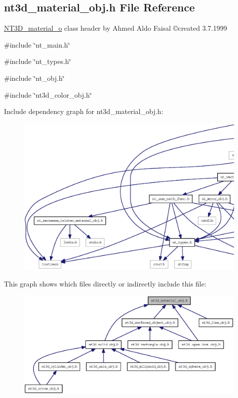 \subsection{nt3d\_\-material\_\-obj.h File Reference}
\label{nt3d__material__obj_8h}



\begin{DoxyItemize}
\item \hyperlink{class_n_t3_d__material__o}{NT3D\_\-material\_\-o} class header by Ahmed Aldo Faisal \copyright created 3.7.1999 
\end{DoxyItemize} 


{\ttfamily \#include \char`\"{}nt\_\-main.h\char`\"{}}\par
{\ttfamily \#include \char`\"{}nt\_\-types.h\char`\"{}}\par
{\ttfamily \#include \char`\"{}nt\_\-obj.h\char`\"{}}\par
{\ttfamily \#include \char`\"{}nt3d\_\-color\_\-obj.h\char`\"{}}\par
Include dependency graph for nt3d\_\-material\_\-obj.h:
\nopagebreak
\begin{figure}[H]
\begin{center}
\leavevmode
\includegraphics[width=400pt]{nt3d__material__obj_8h__incl}
\end{center}
\end{figure}
This graph shows which files directly or indirectly include this file:
\nopagebreak
\begin{figure}[H]
\begin{center}
\leavevmode
\includegraphics[width=400pt]{nt3d__material__obj_8h__dep__incl}
\end{center}
\end{figure}
